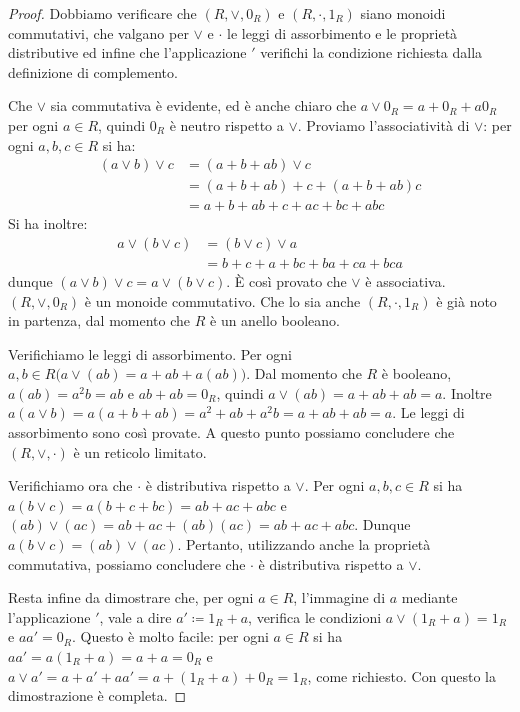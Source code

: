 \begin{proof}
	Dobbiamo verificare che $(R, \vee, 0_{R})$ e $(R, \cdot, 1_{R})$ siano monoidi commutativi, che valgano per $\vee$ e $\cdot$ le leggi di assorbimento e le proprietà distributive ed infine che l’applicazione $'$ verifichi la condizione richiesta dalla definizione di complemento.
	
	Che $\vee$ sia commutativa è evidente, ed è anche chiaro che $a \vee 0_{R} = a + 0_{R}+ a0_{R}$ per ogni $a \in R$, quindi $0_{R}$ è neutro rispetto a $\vee$. Proviamo l'associatività di $\vee$: per ogni $a,b,c \in R$ si ha:
	\begin{align*}
		(a \vee b) \vee c &= (a+b+ab) \vee c \\
		&= (a+b+ab) + c + (a+b+ab)c \\
		&= a+b+ab+c+ac+bc+abc
	\end{align*}
	Si ha inoltre:
	\begin{align*}
		a \vee (b \vee c) &= (b \vee c) \vee a \\
		&= b+c+a+bc+ba+ca+bca
	\end{align*}
	dunque $(a \vee b) \vee c = a \vee (b \vee c)$. È così provato che $\vee$ è associativa. $(R,\vee,0_{R})$ è un monoide commutativo. Che lo sia anche $(R,\cdot,1_{R})$ è già noto in partenza, dal momento che $R$ è un anello booleano.
	
	Verifichiamo le leggi di assorbimento. Per ogni $a,b \in R \bigl(a \vee (ab) = a +ab+a(ab) \bigr)$. Dal momento che $R$ è booleano, $a(ab) = a^{2}b = ab$ e $ab+ab=0_{R}$, quindi $a \vee  (ab) = a+ab+ab = a$. Inoltre $a(a \vee b) = a(a+b+ab) = a^{2}+ab+a^{2}b = a+ab+ab=a$. Le leggi di assorbimento sono così provate. A questo punto possiamo concludere che $(R,\vee,\cdot)$ è un reticolo limitato.
	
	Verifichiamo ora che $\cdot$ è distributiva rispetto a $\vee$. Per ogni $a,b,c \in R$ si ha $a(b \vee c) = a(b+c+bc)=ab+ac+abc$ e $(ab) \vee (ac) = ab+ac+(ab)(ac) = ab+ac+abc$. Dunque $a(b \vee c) = (ab) \vee (ac)$. Pertanto, utilizzando anche la proprietà commutativa, possiamo concludere che $\cdot$ è distributiva rispetto a $\vee$.
	
	Resta infine da dimostrare che, per ogni $a \in R$, l'immagine di $a$ mediante l'applicazione $'$, vale a dire $a' \coloneqq 1_{R}+a$, verifica le condizioni $a \vee (1_{R}+a)= 1_{R}$ e $aa' = 0_{R}$. Questo è molto facile: per ogni $a \in R$ si ha $aa'=a(1_{R}+a) = a+a = 0_{R}$ e $a \vee a' = a+a'+aa' = a+(1_{R}+a)+0_{R}=1_{R}$, come richiesto. Con questo la dimostrazione è completa. 
\end{proof}

